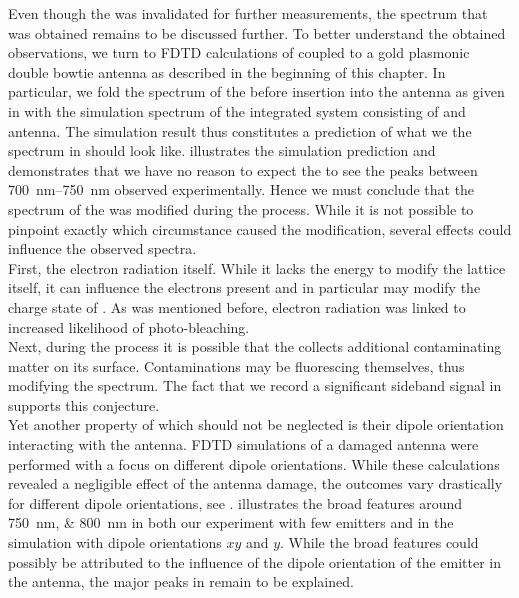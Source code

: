 				Even though the \nd was invalidated for further measurements, the spectrum that was obtained remains to be discussed further. To better understand the obtained observations, we turn to FDTD calculations of \nd coupled to a gold plasmonic double bowtie antenna as described in the beginning of this chapter. In particular, we fold the spectrum of the \nd before insertion into the antenna as given in  with the simulation spectrum of the integrated system consisting of \nd and antenna. The simulation result thus constitutes a prediction of what we the spectrum in  should look like.  illustrates the simulation prediction and demonstrates that we have no reason to expect the to see the peaks between \SIrange{700}{750}{nm} observed experimentally. Hence we must conclude that the spectrum of the \nd was modified during the \pp process. While it is not possible to pinpoint exactly which circumstance caused the modification, several effects could influence the observed spectra.
				\\
				First, the electron radiation itself. While it lacks the energy to modify the lattice itself, it can influence the electrons present and in particular may modify the charge state of \sivs. As was mentioned before, electron radiation was linked to increased likelihood of photo-bleaching.
				\\
				Next, during the \pp process it is possible that the \nd collects additional contaminating matter on its surface. Contaminations may be fluorescing themselves, thus modifying the spectrum. The fact that we record a significant sideband signal in  supports this conjecture.
				\\
				Yet another property of \sivs which should not be neglected is their dipole orientation interacting with the antenna.
				FDTD simulations of a damaged antenna were performed with a focus on different dipole orientations.
				While these calculations revealed a negligible effect of the antenna damage, the outcomes vary drastically for different dipole orientations, see .
				 illustrates the broad features around \SIlist{750;800}{nm} in both our experiment with few emitters and in the simulation with dipole orientations $xy$ and $y$. While the broad features could possibly be attributed to the influence of the dipole orientation of the emitter in the antenna, the major peaks in  remain to be explained.

